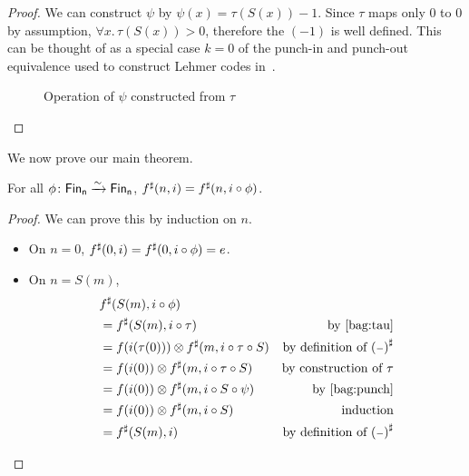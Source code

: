 \begin{proof}
We can construct $\psi$ by $\psi(x) = \tau(S(x)) - 1$.
Since $\tau$ maps only 0 to 0 by assumption, $\forall x. \, \tau(S(x)) > 0$, therefore
the $(- 1)$ is well defined. This can be thought of as a special case $k = 0$ of the punch-in and punch-out
equivalence used to construct Lehmer codes in~\cite{choudhurySymmetriesReversibleProgramming2022}.

\begin{figure}[H]
    \centering
    \hspace{1em}
    \caption{Operation of $\psi$ constructed from $\tau$}
    \label{fig:enter-label}
\end{figure}
\end{proof}


We now prove our main theorem.

\begin{theorem}\label{bag:perm-sat}
For all $\phi\colon \Fin[n]\xto{\sim}\Fin[n]$, $\ext{f}(n, i) \id \ext{f}(n, i \circ \phi)$.
\end{theorem}

\begin{proof}
We can prove this by induction on $n$.
\begin{itemize}
    \item On $n = 0$, $\ext{f}(0, i) \id \ext{f}(0, i \circ \phi) = e$.
    \item On $n = S(m)$,
        \begin{align*}
        & {f}^{\sharp}(S(m), i \circ \phi) \\
        & = {f}^{\sharp}(S(m), i \circ \tau) & \text{by~\ref{bag:tau}} \\
        & = f(i(\tau(0))) \otimes {f}^{\sharp}(m, i \circ \tau \circ S) & \text{by definition of ${({\scriptstyle{-}})}^{\sharp}$} \\
        & = f(i(0)) \otimes {f}^{\sharp}(m, i \circ \tau \circ S) & \text{by construction of $\tau$} \\
        & = f(i(0)) \otimes {f}^{\sharp}(m, i \circ S \circ \psi) &\text{by~\ref{bag:punch}} \\
        & = f(i(0)) \otimes {f}^{\sharp}(m, i \circ S) & \text{induction} \\
        & = {f}^{\sharp}(S(m), i) & \text{by definition of ${({\scriptstyle{-}})}^{\sharp}$}
        \end{align*}
\end{itemize}
\end{proof}

